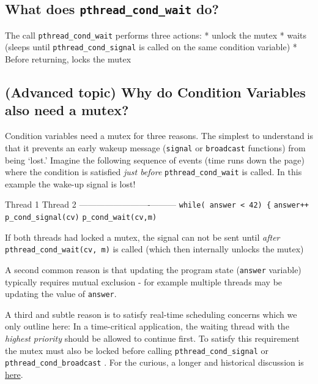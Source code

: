 \subsection{\texorpdfstring{What does \texttt{pthread\_cond\_wait}
do?}{What does pthread\_cond\_wait do?}}\label{what-does-pthreadux5fcondux5fwait-do}

The call \texttt{pthread\_cond\_wait} performs three actions: * unlock
the mutex * waits (sleeps until \texttt{pthread\_cond\_signal} is called
on the same condition variable) * Before returning, locks the mutex

\subsection{(Advanced topic) Why do Condition Variables also need a
mutex?}\label{advanced-topic-why-do-condition-variables-also-need-a-mutex}

Condition variables need a mutex for three reasons. The simplest to
understand is that it prevents an early wakeup message (\texttt{signal}
or \texttt{broadcast} functions) from being `lost.' Imagine the
following sequence of events (time runs down the page) where the
condition is satisfied \emph{just before} \texttt{pthread\_cond\_wait}
is called. In this example the wake-up signal is lost!

Thread 1 \textbar{} Thread 2
-------------------------\textbar{}---------
\texttt{while(\ answer\ \textless{}\ 42)\ \{} \textbar{} \textbar{}
\texttt{answer++} \textbar{} \texttt{p\_cond\_signal(cv)}
\texttt{p\_cond\_wait(cv,m)} \textbar{}

If both threads had locked a mutex, the signal can not be sent until
\emph{after} \texttt{pthread\_cond\_wait(cv,\ m)} is called (which then
internally unlocks the mutex)

A second common reason is that updating the program state
(\texttt{answer} variable) typically requires mutual exclusion - for
example multiple threads may be updating the value of \texttt{answer}.

A third and subtle reason is to satisfy real-time scheduling concerns
which we only outline here: In a time-critical application, the waiting
thread with the \emph{highest priority} should be allowed to continue
first. To satisfy this requirement the mutex must also be locked before
calling \texttt{pthread\_cond\_signal} or
\texttt{pthread\_cond\_broadcast} . For the curious, a longer and
historical discussion is
\href{https://groups.google.com/forum/?hl=ky\#!msg/comp.programming.threads/wEUgPq541v8/ZByyyS8acqMJ}{here}.

